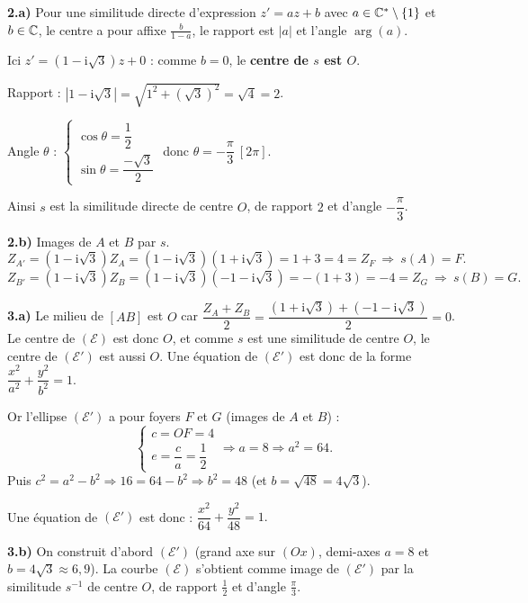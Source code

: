 \smallskip
\noindent\textbf{2.a)} Pour une similitude directe d'expression $z'=az+b$ avec $a\in\mathbb{C}^*\setminus\{1\}$
et $b\in\mathbb{C}$, le centre a pour affixe $\frac{b}{1-a}$, le rapport est $|a|$ et l'angle $\arg(a)$.

Ici $z'=(1-\mathrm{i}\sqrt3)z+0$ : comme $b=0$, le \textbf{centre de $s$ est $O$}.

Rapport : $|1-\mathrm{i}\sqrt3|=\sqrt{1^2+(\sqrt3)^2}=\sqrt4=2$.

Angle $\theta$ : $\begin{cases}\cos\theta=\dfrac12\\[2pt]\sin\theta=\dfrac{-\sqrt3}{2}\end{cases}$
donc $\theta=-\dfrac\pi3\ [2\pi]$.

Ainsi $s$ est la similitude directe de centre $O$, de rapport $2$ et d'angle $-\dfrac\pi3$.

\smallskip
\noindent\textbf{2.b)} Images de $A$ et $B$ par $s$.
\[ Z_{A'}=(1-\mathrm{i}\sqrt3)Z_A=(1-\mathrm{i}\sqrt3)(1+\mathrm{i}\sqrt3)=1+3=4=Z_F\ \Longrightarrow\ s(A)=F. \]
\[ Z_{B'}=(1-\mathrm{i}\sqrt3)Z_B=(1-\mathrm{i}\sqrt3)(-1-\mathrm{i}\sqrt3)=-(1+3)=-4=Z_G\ \Longrightarrow\ s(B)=G. \]

\smallskip
\noindent\textbf{3.a)} Le milieu de $[AB]$ est $O$ car $\dfrac{Z_A+Z_B}{2}=\dfrac{(1+\mathrm{i}\sqrt3)+(-1-\mathrm{i}\sqrt3)}{2}=0$.
Le centre de $(\mathcal{E})$ est donc $O$, et comme $s$ est une similitude de centre $O$, le centre
de $(\mathcal{E}')$ est aussi $O$. Une équation de $(\mathcal{E}')$ est donc de la forme
$\dfrac{x^2}{a^2}+\dfrac{y^2}{b^2}=1$.

Or l'ellipse $(\mathcal{E}')$ a pour foyers $F$ et $G$ (images de $A$ et $B$) :
\[ \begin{cases}c=OF=4\\[2pt]e=\dfrac ca=\dfrac12\end{cases}\Longrightarrow a=8\Longrightarrow a^2=64. \]
Puis $c^2=a^2-b^2\Rightarrow 16=64-b^2\Rightarrow b^2=48$ (et $b=\sqrt{48}=4\sqrt3$).

Une équation de $(\mathcal{E}')$ est donc : $\boxed{\dfrac{x^2}{64}+\dfrac{y^2}{48}=1.}$

\smallskip
\noindent\textbf{3.b)} On construit d'abord $(\mathcal{E}')$ (grand axe sur $(Ox)$, demi-axes $a=8$ et
$b=4\sqrt3\approx6{,}9$). La courbe $(\mathcal{E})$ s'obtient comme image de $(\mathcal{E}')$ par la similitude
$s^{-1}$ de centre $O$, de rapport $\frac12$ et d'angle $\frac\pi3$.

